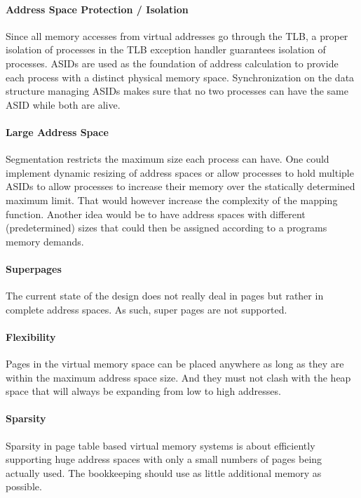\paragraph{Address Space Protection / Isolation} Since all memory accesses from virtual addresses go through the TLB, a proper isolation of processes in the TLB exception handler guarantees isolation of processes. ASIDs are used as the foundation of address calculation to provide each process with a distinct physical memory space.
Synchronization on the data structure managing ASIDs makes sure that no two processes can have the same ASID while both are alive.

\paragraph{Large Address Space} Segmentation restricts the maximum size each process can have. One could implement dynamic resizing of address spaces or allow processes to hold multiple ASIDs to allow processes to increase their memory over the statically determined maximum limit.
That would however increase the complexity of the mapping function. Another idea would be to have address spaces with different (predetermined) sizes that could then be assigned according to a programs memory demands.

\paragraph{Superpages} The current state of the design does not really deal in pages but rather in complete address spaces. As such, super pages are not supported.

\paragraph{Flexibility} Pages in the virtual memory space can be placed anywhere as long as they are within the maximum address space size. And they must not clash with the heap space that will always be expanding from low to high addresses.

\paragraph{Sparsity} Sparsity in page table based virtual memory systems is about efficiently
supporting huge address spaces with only a small numbers of pages being actually used. The bookkeeping should use as little additional memory as possible.

